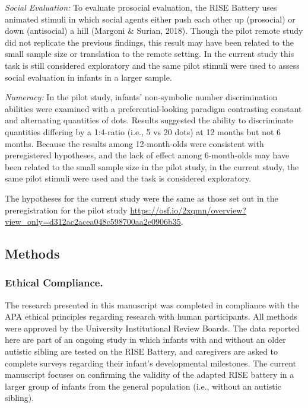\documentclass[
  english,
  man,floatsintext]{apa6}
\begin{document}
\emph{Social Evaluation:} To evaluate prosocial evaluation, the RISE Battery uses animated stimuli in which social agents either push each other up (prosocial) or down (antisocial) a hill (Margoni \& Surian, 2018).
Though the pilot remote study did not replicate the previous findings, this result may have been related to the small sample size or translation to the remote setting. In the current study this task is still considered exploratory and the same pilot stimuli were used to assess social evaluation in infants in a larger sample.

\emph{Numeracy:} In the pilot study, infants' non-symbolic number discrimination abilities were examined with a preferential-looking paradigm contrasting constant and alternating quantities of dots.
Results suggested the ability to discriminate quantities differing by a 1:4-ratio (i.e., 5 vs 20 dots) at 12 months but not 6 months. Because the results among 12-month-olds were consistent with preregistered hypotheses, and the lack of effect among 6-month-olds may have been related to the small sample size in the pilot study, in the current study, the same pilot stimuli were used and the task is considered exploratory.

The hypotheses for the current study were the same as those set out in the preregistration for the pilot study \url{https://osf.io/2xqmn/overview?view_only=d312ac2acea048c598700aa2e0906b35}.

\subsection{Methods}\label{methods}

\subsubsection{Ethical Compliance.}\label{ethical-compliance.}

The research presented in this manuscript was completed in compliance with the APA ethical principles regarding research with human participants.
All methods were approved by the University Institutional Review Boards.
The data reported here are part of an ongoing study in which infants with and without an older autistic sibling are tested on the RISE Battery, and caregivers are asked to complete surveys regarding their infant's developmental milestones.
The current manuscript focuses on confirming the validity of the adapted RISE battery in a larger group of infants from the general population (i.e., without an autistic sibling).
\end{document}
